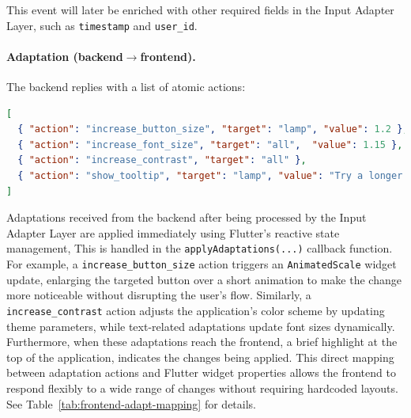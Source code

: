 This event will later be enriched with other required fields in the Input Adapter Layer, such as \texttt{timestamp} and \texttt{user\_id}.

\paragraph{Adaptation (backend$\rightarrow$frontend).} The backend replies with a list of atomic actions:
\begin{lstlisting}[language=json, basicstyle=\ttfamily\small, caption={Adaptation example actions}]
[
  { "action": "increase_button_size", "target": "lamp", "value": 1.2 },
  { "action": "increase_font_size", "target": "all",  "value": 1.15 },
  { "action": "increase_contrast", "target": "all" },
  { "action": "show_tooltip", "target": "lamp", "value": "Try a longer press" }
]
\end{lstlisting}

Adaptations received from the backend after being processed by the Input Adapter Layer are applied immediately using Flutter’s reactive state management, This is handled in the \verb|applyAdaptations(...)| callback function. For example, a \texttt{increase\_button\_size} action triggers an \texttt{AnimatedScale} widget update, enlarging the targeted button over a short animation to make the change more noticeable without disrupting the user’s flow. Similarly, a \texttt{increase\_contrast} action adjusts the application’s color scheme by updating theme parameters, while text-related adaptations update font sizes dynamically. Furthermore, when these adaptations reach the frontend, a brief highlight at the top of the application, indicates the changes being applied. This direct mapping between adaptation actions and Flutter widget properties allows the frontend to respond flexibly to a wide range of changes without requiring hardcoded layouts. See Table~\ref{tab:frontend-adapt-mapping} for details.

